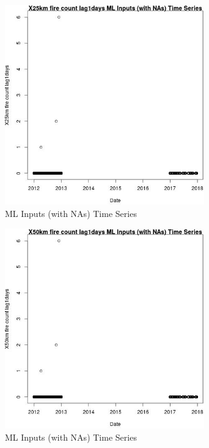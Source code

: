 \begin{figure} 
\centering  
\includegraphics[width=0.77\textwidth]{Code_Outputs/Report_ML_input_PM25_Step4_part_e_de_duplicated_aves_compiled_2019-05-14wNAs_X25km_fire_count_lag1daysvDate.jpg} 
\caption{\label{fig:Report_ML_input_PM25_Step4_part_e_de_duplicated_aves_compiled_2019-05-14wNAsX25km_fire_count_lag1daysvDate}ML Inputs (with NAs) Time Series} 
\end{figure} 
 

\begin{figure} 
\centering  
\includegraphics[width=0.77\textwidth]{Code_Outputs/Report_ML_input_PM25_Step4_part_e_de_duplicated_aves_compiled_2019-05-14wNAs_X50km_fire_count_lag1daysvDate.jpg} 
\caption{\label{fig:Report_ML_input_PM25_Step4_part_e_de_duplicated_aves_compiled_2019-05-14wNAsX50km_fire_count_lag1daysvDate}ML Inputs (with NAs) Time Series} 
\end{figure} 
 

